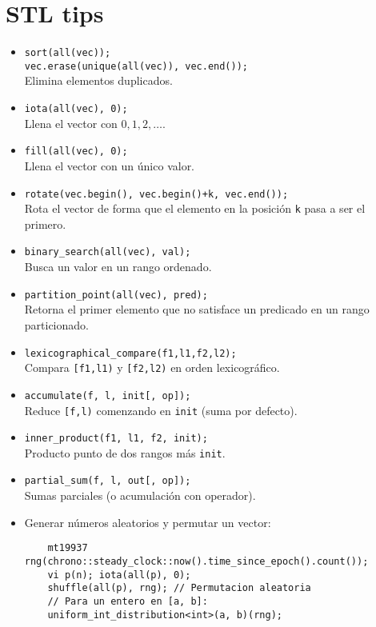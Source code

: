 \section{STL tips}
\begin{itemize}
    \item \verb|sort(all(vec));| \\ \verb|vec.erase(unique(all(vec)), vec.end());| \\
    Elimina elementos duplicados.
    \item \verb|iota(all(vec), 0);| \\
    Llena el vector con $0, 1, 2, \dots$.
    \item \verb|fill(all(vec), 0);| \\
    Llena el vector con un único valor.
    \item \lstinline|rotate(vec.begin(), vec.begin()+k, vec.end());| \\
    Rota el vector de forma que el elemento en la posición \texttt{k} pasa a ser el primero.
    \item \verb|binary_search(all(vec), val);| \\
    Busca un valor en un rango ordenado.
    \item \verb|partition_point(all(vec), pred);| \\
    Retorna el primer elemento que no satisface un predicado en un rango particionado.
    \item \verb|lexicographical_compare(f1,l1,f2,l2);| \\
    Compara \verb|[f1,l1)| y \verb|[f2,l2)| en orden lexicográfico.
    \item \verb|accumulate(f, l, init[, op]);| \\
    Reduce \verb|[f,l)| comenzando en \verb|init| (suma por defecto).
    \item \verb|inner_product(f1, l1, f2, init);| \\
    Producto punto de dos rangos más \verb|init|.
    \item \verb|partial_sum(f, l, out[, op]);| \\
    Sumas parciales (o acumulación con operador).
    \item Generar números aleatorios y permutar un vector:
\begin{lstlisting}
    mt19937 rng(chrono::steady_clock::now().time_since_epoch().count());
    vi p(n); iota(all(p), 0);
    shuffle(all(p), rng); // Permutacion aleatoria
    // Para un entero en [a, b]:
    uniform_int_distribution<int>(a, b)(rng);
\end{lstlisting}
\end{itemize}

